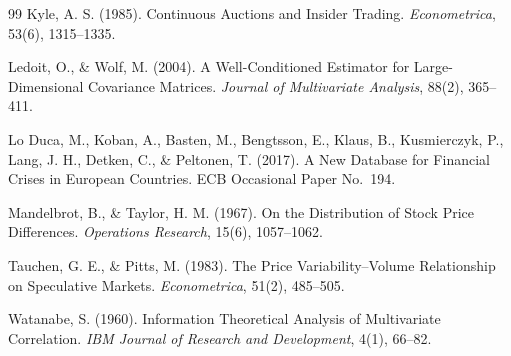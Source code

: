 \documentclass[11pt]{article}
\theoremstyle{definition}
\begin{document}
\begin{thebibliography}{99}
 Kyle, A. S. (1985). Continuous Auctions and Insider Trading. \textit{Econometrica}, 53(6), 1315--1335.

 Ledoit, O., \& Wolf, M. (2004). A Well-Conditioned Estimator for Large-Dimensional Covariance Matrices. \textit{Journal of Multivariate Analysis}, 88(2), 365--411.

 Lo Duca, M., Koban, A., Basten, M., Bengtsson, E., Klaus, B., Kusmierczyk, P., Lang, J. H., Detken, C., \& Peltonen, T. (2017). A New Database for Financial Crises in European Countries. ECB Occasional Paper No.~194.

 Mandelbrot, B., \& Taylor, H. M. (1967). On the Distribution of Stock Price Differences. \textit{Operations Research}, 15(6), 1057--1062.

 Tauchen, G. E., \& Pitts, M. (1983). The Price Variability--Volume Relationship on Speculative Markets. \textit{Econometrica}, 51(2), 485--505.

 Watanabe, S. (1960). Information Theoretical Analysis of Multivariate Correlation. \textit{IBM Journal of Research and Development}, 4(1), 66--82.

\end{thebibliography}
\end{document}
